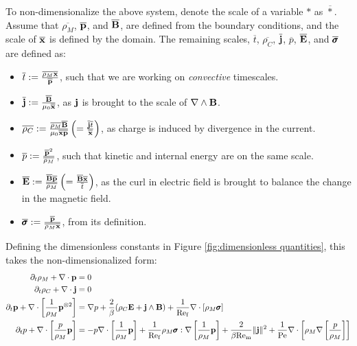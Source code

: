     To non-dimensionalize the above system, denote the scale of a variable $*$ as $\overline{*}$. Assume that $\overline{\rho_{M}}$, $\overline{\mathbf{p}}$, and $\overline{\mathbf{B}}$, are defined from the boundary conditions, and the scale of $\overline{\mathbf{x}}$ is defined by the domain. The remaining scales, $\overline{t}$, $\overline{\rho_{C}}$, $\overline{\mathbf{j}}$, $\overline{p}$, $\overline{\mathbf{E}}$, and $\overline{\pmb{\mathsf{\sigma}}}$ are defined as:  
    \begin{itemize}
        \item  $\overline{t}  :=  \frac{\overline{\rho_{M}}\overline{\mathbf{x}}}{\overline{\mathbf{p}}}$, such that we are working on \emph{convective} timescales.
        \item  $\overline{\mathbf{j}}  :=  \frac{\overline{\mathbf{B}}}{\mu_{0}\overline{\mathbf{x}}}$, as $\mathbf{j}$ is brought to the scale of $\nabla\wedge\mathbf{B}$.
        \item  $\overline{\rho_{C}}  :=  \frac{\overline{\rho_{M}}\overline{\mathbf{B}}}{\mu_{0}\overline{\mathbf{x}}\overline{\mathbf{p}}}  \left(=  \frac{\overline{\mathbf{j}}\overline{t}}{\overline{\mathbf{x}}}\right)$, as charge is induced by divergence in the current.
        \item  $\overline{p}  :=  \frac{\overline{\mathbf{p}}^{2}}{\overline{\rho_{M}}}$, such that kinetic and internal energy are on the same scale.
        \item  $\overline{\mathbf{E}}  :=  \frac{\overline{\mathbf{B}}\overline{\mathbf{p}}}{\overline{\rho_{M}}}  \left(=  \frac{\overline{\mathbf{B}}\overline{\mathbf{x}}}{\overline{t}}\right)$, as the curl in electric field is brought to balance the change in the magnetic field.
        \item  $\overline{\pmb{\mathsf{\sigma}}}  :=  \frac{\overline{\mathbf{p}}}{\overline{\rho_{M}}\overline{\mathbf{x}}}$, from its definition.
    \end{itemize}
    Defining the dimensionless constants in Figure \ref{fig:dimensionless quantities}, this takes the non-dimensionalized form:
    {\small \begin{align}
        \partial_{t}\rho_{M} + \nabla\cdot\mathbf{p}  &=  0  \\
        \partial_{t}\rho_{C} + \nabla\cdot\mathbf{j}  &=  0  \\
        \partial_{t}\mathbf{p} + \nabla\cdot\left[\frac{1}{\rho_{M}}\mathbf{p}^{\otimes 2}\right]  &=  \nabla p + \frac{2}{\beta}(\rho_{C}\mathbf{E} + \mathbf{j}\wedge\mathbf{B}) + \frac{1}{\mathrm{Re}_{\mathrm{f}}}\nabla\cdot[\rho_{M}\pmb{\mathsf{\sigma}}]  \\
        \partial_{t}p + \nabla\cdot\left[\frac{p}{\rho_{M}}\mathbf{p}\right]  &=  - p\nabla\cdot\left[\frac{1}{\rho_{M}}\mathbf{p}\right] + \frac{1}{\mathrm{Re}_{\mathrm{f}}}\rho_{M}\pmb{\mathsf{\sigma}}:\nabla\left[\frac{1}{\rho_{M}}\mathbf{p}\right] + \frac{2}{\beta\mathrm{Re}_{\mathrm{m}}}\|\mathbf{j}\|^{2} + \frac{1}{\mathrm{Pe}}\nabla\cdot\left[\rho_{M}\nabla\left[\frac{p}{\rho_{M}}\right]\right]
    \end{align}}
